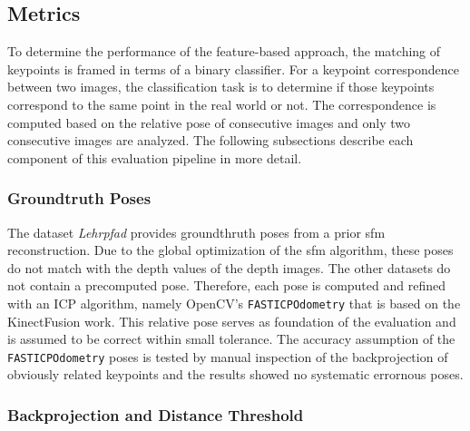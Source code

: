 \subsection{Metrics}

To determine the performance of the feature-based approach, the matching of keypoints is framed in terms of a binary classifier.
For a keypoint correspondence between two images, the classification task is to determine if those keypoints correspond to the same point in the real world or not.
The correspondence is computed based on the relative pose of consecutive images and only two consecutive images are analyzed.
The following subsections describe each component of this evaluation pipeline in more detail.

\subsubsection{Groundtruth Poses}

The dataset \emph{Lehrpfad} provides groundthruth poses from a prior \gls{sfm} reconstruction.
Due to the global optimization of the \gls{sfm} algorithm, these poses do not match with the depth values of the depth images.
The other datasets do not contain a precomputed pose.
Therefore, each pose is computed and refined with an ICP algorithm, namely OpenCV's \texttt{FASTICPOdometry} that is based on the KinectFusion\cite{newcombe_ismar2011} work.
This relative pose serves as foundation of the evaluation and is assumed to be correct within small tolerance.
The accuracy assumption of the \texttt{FASTICPOdometry} poses is tested by manual inspection of the backprojection of obviously related keypoints and the results showed no systematic errornous poses.

\subsubsection{Backprojection and Distance Threshold}

